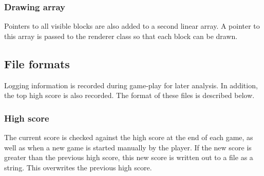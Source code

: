 \subsubsection{Drawing array}
Pointers to all visible blocks are also added to a second linear array. A pointer to this array is passed to the renderer class so that each block can be drawn.

\subsection{File formats}
Logging information is recorded during game-play for later analysis. In addition, the top high score is also recorded. The format of these files is described below.

\subsubsection{High score}
The current score is checked against the high score at the end of each game, as well as when a new game is started manually by the player. If the new score is greater than the previous high score, this new score is written out to a file as a string. This overwrites the previous high score.

